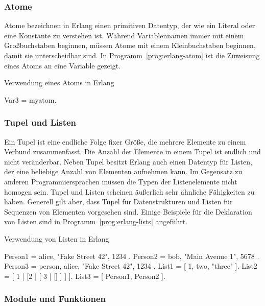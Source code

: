 \subsubsection{Atome}

Atome bezeichnen in Erlang einen primitiven Datentyp, der wie ein Literal oder eine Konstante zu verstehen ist. Während Variablennamen immer mit einem Großbuchstaben beginnen, müssen Atome mit einem Kleinbuchstaben beginnen, damit sie unterscheidbar sind. In Programm~\ref{prog:erlang-atom} ist die Zuweisung eines Atoms an eine Variable gezeigt.

\begin{program}[!hbt]
\caption{Verwendung eines Atoms in Erlang}
\label{prog:erlang-atom}
\begin{ErlangCode}
Var3 = myatom.
\end{ErlangCode}
\end{program}

\subsubsection{Tupel und Listen}

Ein Tupel ist eine endliche Folge fixer Größe, die mehrere Elemente zu einem Verbund zusammenfasst. Die Anzahl der Elemente in einem Tupel ist endlich und nicht veränderbar. Neben Tupel besitzt Erlang auch einen Datentyp für Listen, der eine beliebige Anzahl von Elementen aufnehmen kann. Im Gegensatz zu anderen Programmiersprachen müssen die Typen der Listenelemente nicht homogen sein. Tupel und Listen scheinen äußerlich sehr ähnliche Fähigkeiten zu haben. Generell gilt aber, dass Tupel für Datenstrukturen und Listen für Sequenzen von Elementen vorgesehen sind. Einige Beispiele für die Deklaration von Listen sind in Programm~\ref{prog:erlang-lists} angeführt.

\begin{program}[!hbt]
\caption{Verwendung von Listen in Erlang}
\label{prog:erlang-lists}
\begin{ErlangCode}
Person1 = { alice, "Fake Street 42", 1234 }.
Person2 = { bob, "Main Avenue 1", 5678 }.
Person3 = { person, alice, "Fake Street 42", 1234 }. %
List1 = [ 1, two, "three" ].
List2 = [ 1 | [2 | [ 3 | [] ] ] ].
List3 = [ Person1, Person2 ].
\end{ErlangCode}
\end{program}

\subsubsection{Module und Funktionen}

